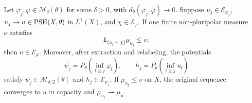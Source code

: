 \begin{theorem}\label{thm:big-varying-model-closure}
Let $\varphi_j,\varphi\in\mathcal M_\delta(\theta)$ for some $\delta>0$, with $d_\theta(\varphi_j,\varphi)\to0$. Suppose $u_j\in\mathcal E_{\varphi_j}$, $u_j\to u\in\mathrm{PSH}(X,\theta)$ in $L^1(X)$, and $\chi\in\mathcal E_\varphi$. If one finite non-pluripolar measure $\nu$ satisfies
\[
 \mathbf1_{\{u_j\leq\chi\}}\mu_{u_j}\leq\nu,
\]
then $u\in\mathcal E_\varphi$. Moreover, after extraction and relabeling, the potentials
\[
 \psi_j=P_\theta\left(\inf_{l\geq j}\varphi_l\right),\qquad
 h_j=P_\theta\left(\inf_{l\geq j}u_l\right)
\]
satisfy $\psi_j\in\mathcal M_{\delta/2}(\theta)$ and $h_j\in\mathcal E_{\psi_j}$.
If $\mu_{u_j}\leq\nu$ on $X$, the original sequence converges to $u$ in capacity and $\mu_{u_j}\rightharpoonup\mu_u$.
\end{theorem}
